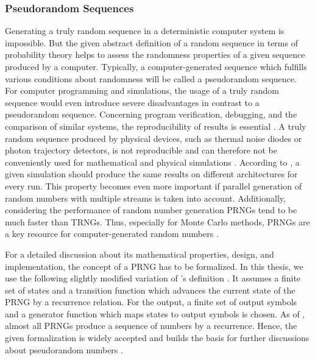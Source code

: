 \documentclass{stdlocal}
\begin{document}
    \subsubsection*{Pseudorandom Sequences}
    Generating a truly random sequence in a deterministic computer system is impossible.
    But the given abstract definition of a random sequence in terms of probability theory helps to assess the randomness properties of a given sequence produced by a computer.
    Typically, a computer-generated sequence which fulfills various conditions about randomness will be called a pseudorandom sequence.
    For computer programming and simulations, the usage of a truly random sequence would even introduce severe disadvantages in contrast to a pseudorandom sequence.
    Concerning program verification, debugging, and the comparison of similar systems, the reproducibility of results is essential \autocite{lecuyer2015}.
    A truly random sequence produced by physical devices, such as thermal noise diodes or photon trajectory detectors, is not reproducible and can therefore not be conveniently used for mathematical and physical simulations \autocite{lecuyer2015}.
    According to \textcite{lecuyer2015}, a given simulation should produce the same results on different architectures for every run.
    This property becomes even more important if parallel generation of random numbers with multiple streams is taken into account.
    Additionally, considering the performance of random number generation PRNGs tend to be much faster than TRNGs.
    Thus, especially for Monte Carlo methods, PRNGs are a key resource for computer-generated random numbers \autocite{bauke2007}.

    For a detailed discussion about its mathematical properties, design, and implementation, the concept of a PRNG has to be formalized.
    In this thesis, we use the following slightly modified variation of \citeauthor{lecuyer1994}'s definition \autocite{lecuyer1994,lecuyer2015,barash2017,bauke2007}.
    It assumes a finite set of states and a transition function which advances the current state of the PRNG by a recurrence relation.
    For the output, a finite set of output symbols and a generator function which maps states to output symbols is chosen.
    As of \textcite{bauke2007}, almost all PRNGs produce a sequence of numbers by a recurrence.
    Hence, the given formalization is widely accepted and builds the basis for further discussions about pseudorandom numbers \autocite{lecuyer1994,lecuyer2015,barash2017,bauke2007}.
\end{document}
